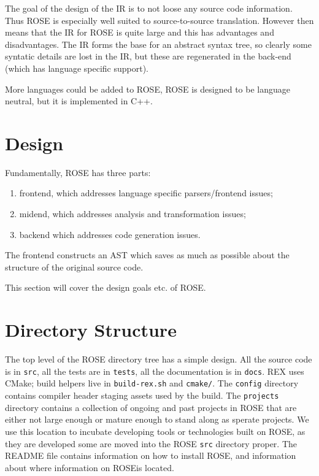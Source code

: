    The goal of the design of the IR is to not loose any source code information.
Thus ROSE is especially well suited to source-to-source translation. However
then means that the IR for ROSE is quite large and this has advantages and
disadvantages.  The IR forms the base for an abstract syntax tree, so clearly
some syntatic details are lost in the IR, but these are regenerated in the 
back-end (which has language specific support).

   More languages could be added to ROSE, ROSE is designed to be language
neutral, but it is implemented in C++.

\section{Design}

Fundamentally, ROSE has three parts:
\begin{enumerate}
   \item frontend, which addresses language specific parsers/frontend issues;
   \item midend, which addresses analysis and transformation issues; 
   \item backend which addresses code generation issues.
\end{enumerate}

   The frontend constructs an AST which saves as much as possible about the structure of
the original source code.

   This section will cover the design goals etc. of ROSE.

\section{Directory Structure}

   The top level of the ROSE directory tree has a simple design.
All the source code is in {\tt src}, all the tests are in {\tt tests},
all the documentation is in {\tt docs}.  REX uses CMake; build helpers live in
{\tt build-rex.sh} and {\tt cmake/}. The {\tt config} directory contains
compiler header staging assets used by the build.
The {\tt projects} directory contains a collection of ongoing and past
projects in ROSE that are either not large enough or mature enough to stand
along as sperate projects.  We use this location to incubate developing tools
or technologies built on ROSE, as they are developed some are moved
into the ROSE {\tt src} directory proper.  The README file contains
information on how to install ROSE, and information about where information
on ROSEis located.


